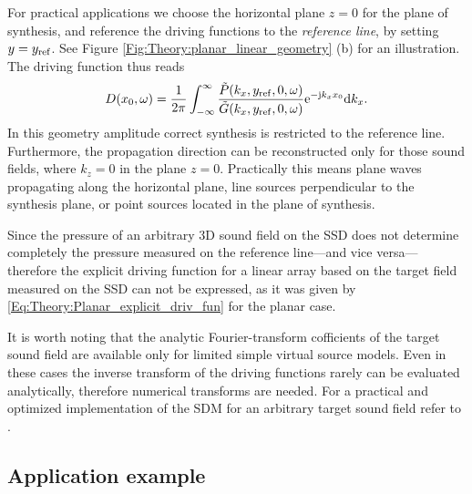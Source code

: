 For practical applications we choose the horizontal plane $z=0$ for the plane of synthesis, and reference the driving functions to the \emph{reference line}, by setting $y = y_{\mathrm{ref}}$.
See Figure \ref{Fig:Theory:planar_linear_geometry} (b) for an illustration. The driving function thus reads
\begin{equation}
D(x_0,\omega) = \frac{1}{2\pi} \int_{-\infty}^{\infty} \frac{\tilde{P}(k_x,y_{\mathrm{ref}},0, \omega) }{\tilde{G}(k_x,y_{\mathrm{ref}},0, \omega)} \mathrm{e}^{-\mathrm{j} k_x x_0} \mathrm{d} k_x.
\label{Eq:Theory:Linear_SDM}
\end{equation}
In this geometry amplitude correct synthesis is restricted to the reference line.
Furthermore, the propagation direction can be reconstructed only for those sound fields, where $k_z = 0$ in the plane $z=0$. Practically this means plane waves propagating along the horizontal plane, line sources perpendicular to the synthesis plane, or point sources located in the plane of synthesis.

Since the pressure of an arbitrary 3D sound field on the SSD does not determine completely the pressure measured on the reference line---and vice versa---therefore the explicit driving function for a linear array based on the target field measured on the SSD can not be expressed, 
as it was given by \eqref{Eq:Theory:Planar_explicit_driv_fun} for the planar case.

\vspace{3mm}
It is worth noting that the analytic Fourier-transform cofficients of the target sound field are available only for limited simple virtual source models. Even in these cases the inverse transform of the driving functions rarely can be evaluated analytically, therefore numerical transforms are needed.
For a practical and optimized implementation of the SDM for an arbitrary target sound field refer to \cite{ahrens2013a:efficientSDM}.

%


\subsection{Application example}

